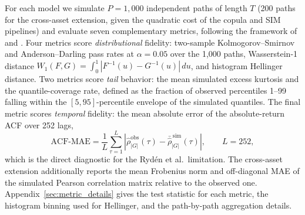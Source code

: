 For each model we simulate $P = 1{,}000$ independent paths of length $T$ (200 paths for the cross-asset extension, given the quadratic cost of the copula and SIM pipelines) and evaluate seven complementary metrics, following the framework of \cite{stenger2024thinking} and \cite{alswaidan2026hybrid}.
Four metrics score \emph{distributional} fidelity: two-sample Kolmogorov--Smirnov \cite{kolmogorov1933, smirnov1948} and Anderson--Darling pass rates at $\alpha = 0.05$ over the 1{,}000 paths, Wasserstein-1 distance $W_1(F, G) = \int_0^1 |F^{-1}(u) - G^{-1}(u)|\, du$, and histogram Hellinger distance.
Two metrics score \emph{tail} behavior: the mean simulated excess kurtosis and the quantile-coverage rate, defined as the fraction of observed percentiles 1--99 falling within the $[5, 95]$-percentile envelope of the simulated quantiles.
The final metric scores \emph{temporal} fidelity: the mean absolute error of the absolute-return ACF over 252 lags,
\begin{equation}
    \text{ACF-MAE} = \frac{1}{L}\sum_{\tau=1}^{L} \left| \hat\rho^{\text{obs}}_{|G|}(\tau) - \bar{\hat\rho}^{\,\text{sim}}_{|G|}(\tau) \right|,
    \qquad L = 252,
    \label{eq:acf_mae}
\end{equation}
which is the direct diagnostic for the Ryd\'{e}n et al.\ limitation.
The cross-asset extension additionally reports the mean Frobenius norm and off-diagonal MAE of the simulated Pearson correlation matrix relative to the observed one.
Appendix~\ref{sec:metric_details} gives the test statistic for each metric, the histogram binning used for Hellinger, and the path-by-path aggregation details.

